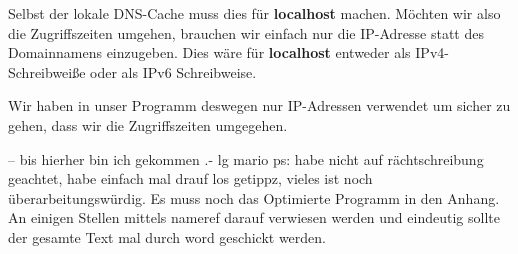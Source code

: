 Selbst der lokale DNS-Cache muss dies \zB für \textbf{localhost} machen.
Möchten wir also die Zugriffszeiten umgehen, brauchen wir einfach nur die IP-Adresse
statt des Domainnamens einzugeben. Dies wäre für \textbf{localhost} entweder  als
IPv4-Schreibweiße oder \gqq{[::1]} als IPv6 Schreibweise.

Wir haben in unser Programm deswegen nur IP-Adressen verwendet um sicher zu gehen, dass wir 
die Zugriffszeiten umgegehen.

-- bis hierher bin ich gekommen .- lg mario
ps: habe nicht auf rächtschreibung geachtet, habe einfach mal drauf los getippz,
vieles ist noch überarbeitungswürdig. Es muss noch das Optimierte Programm in
den Anhang. An einigen Stellen mittels nameref darauf verwiesen werden und
eindeutig sollte der gesamte Text mal durch word geschickt werden.
\clearpage